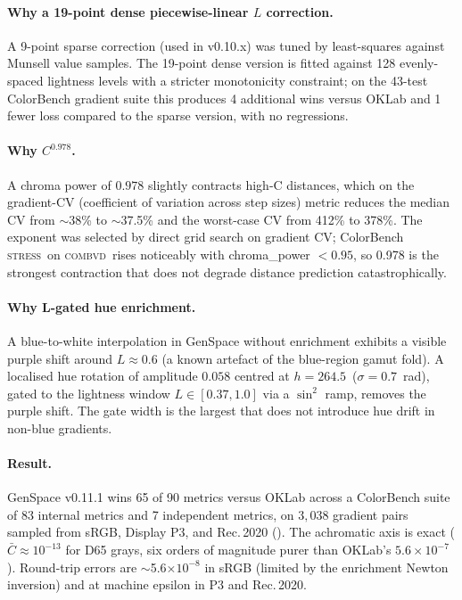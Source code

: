 \documentclass[11pt, twocolumn]{article}
\newcommand{\stress}{\textsc{stress}}
\newcommand{\combvd}{\textsc{combvd}}
\begin{document}
\paragraph{Why a 19-point dense piecewise-linear $L$ correction.}
A 9-point sparse correction (used in v0.10.x) was tuned by least-squares
against Munsell value samples. The 19-point dense version is fitted
against 128 evenly-spaced lightness levels with a stricter monotonicity
constraint; on the 43-test ColorBench gradient suite this produces
4 additional wins versus OKLab and 1 fewer loss compared to the
sparse version, with no regressions.

\paragraph{Why $C^{0.978}$.}
A chroma power of $0.978$ slightly contracts high-C distances, which
on the gradient-CV (coefficient of variation across step sizes)
metric reduces the median CV from $\sim$38\% to $\sim$37.5\% and the
worst-case CV from 412\% to 378\%. The exponent was selected by
direct grid search on gradient CV; ColorBench \stress\ on \combvd\
rises noticeably with chroma\_power $< 0.95$, so 0.978 is the
strongest contraction that does not degrade distance prediction
catastrophically.

\paragraph{Why L-gated hue enrichment.}
A blue-to-white interpolation in GenSpace without enrichment exhibits
a visible purple shift around $L\!\approx\!0.6$ (a known artefact of
the blue-region gamut fold). A localised hue rotation of amplitude
$0.058$ centred at $h=264.5$\textdegree\ ($\sigma=0.7$~rad), gated to
the lightness window $L\!\in\![0.37, 1.0]$ via a $\sin^2$ ramp,
removes the purple shift. The gate width is the largest that does
not introduce hue drift in non-blue gradients.

\paragraph{Result.}
GenSpace v0.11.1 wins 65 of 90 metrics versus OKLab across a
ColorBench suite of 83 internal metrics and 7 independent metrics,
on $3{,}038$ gradient pairs sampled from sRGB, Display P3, and
Rec.\,2020 (). The achromatic axis is
exact ($\bar{C}\!\approx\!10^{-13}$ for D65 grays, six orders of
magnitude purer than OKLab's $5.6\!\times\!10^{-7}$). Round-trip
errors are $\sim$5.6$\times 10^{-8}$ in sRGB (limited by the
enrichment Newton inversion) and at machine epsilon in P3 and
Rec.\,2020.
\end{document}
